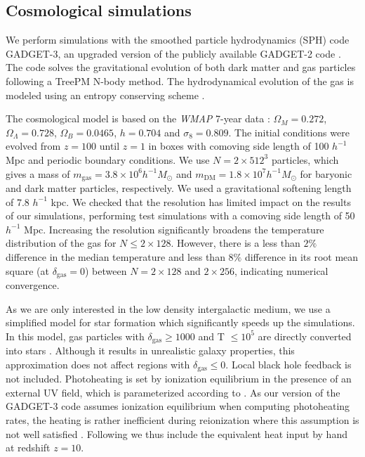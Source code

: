 \documentclass[numberedappendix]{emulateapj}
\begin{document}
{\subsection{Cosmological simulations}
We perform simulations with the smoothed particle hydrodynamics (SPH) code \textsc{GADGET-3}, an upgraded version of the publicly available \textsc{GADGET-2} code \citep{2005MNRAS.364.1105S}. The code solves the gravitational evolution of both dark matter and gas particles following a TreePM N-body method. The hydrodynamical evolution of the gas is modeled using an entropy conserving scheme \citep{2002MNRAS.333..649S}.

The cosmological model is based on the \textit{WMAP} 7-year data \citep{2011ApJS..192...18K}: $\Omega_M=0.272$, $\Omega_{\Lambda}=0.728$, $\Omega_{B}= 0.0465$, $h=0.704$ and $\sigma_8=0.809$. The initial conditions were evolved from $z=100$ until $z=1$ in boxes with comoving side length of 100 $h^{-1}$ Mpc and periodic boundary conditions. We use $N= 2\times 512^3$ particles, which gives a mass of $m_\mathrm{gas}=3.8\times10^{6} h^{-1} M_{\odot}$ and $m_\mathrm{DM}=1.8\times 10^{7} h^{-1} M_{\odot}$ for baryonic and dark matter particles, respectively. We used a gravitational softening length of 7.8 $h^{-1}$ kpc. We checked that the resolution has limited impact on the results of our simulations, performing test simulations with a comoving side length of 50 $h^{-1}$ Mpc. Increasing the resolution significantly broadens the temperature distribution of the gas for $N\leqslant 2\times 128$. However, there is a less than $2\%$ difference in the median temperature and less than $8\%$ difference in its root mean square (at $\delta_{\mathrm{gas}}=0$) between $N=2\times 128$ and $2\times 256$, indicating numerical convergence.

As we are only interested in the low density intergalactic medium, we use a simplified model for star formation which significantly speeds up the simulations. In this model, gas particles with $\delta_{\mathrm{gas}}\geq 1000$ and T $\leq 10^5$ are directly converted into stars \citep{2004MNRAS.354..684V}. Although it results in unrealistic galaxy properties, this approximation does not affect regions with $\delta_{\mathrm{gas}} \leq 0$. Local black hole feedback is not included. Photoheating is set by ionization equilibrium in the presence of an external UV field, which is parameterized according to \citet{2009ApJ...703.1416F}. As our version of the \textsc{GADGET-3} code assumes ionization equilibrium when computing photoheating rates, the heating is rather inefficient during reionization where this assumption is not well satisfied \citep[see e.g.][]{2014arXiv1410.1531P}. Following \citet{2012MNRAS.423..149P} we thus include the equivalent heat input by hand at redshift $z=10$.

}
\end{document}
